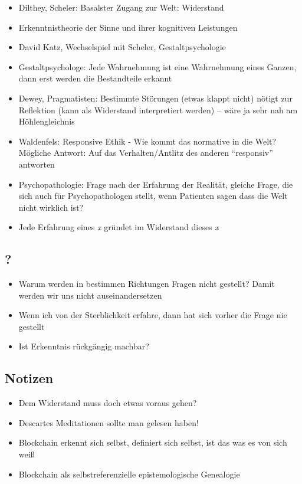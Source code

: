 \documentclass[emulatestandardclasses]{scrartcl}
\begin{document}
\begin{itemize}
  \item Dilthey, Scheler: Basalster Zugang zur Welt: Widerstand
  \item Erkenntnistheorie der Sinne und ihrer kognitiven Leistungen
  \item David Katz, Wechselspiel mit Scheler, Gestaltpsychologie
  \item Gestaltpsychologe: Jede Wahrnehmung ist eine Wahrnehmung eines Ganzen, dann erst werden die Bestandteile erkannt
  \item Dewey, Pragmatisten: Bestimmte Störungen (etwas klappt nicht) nötigt zur Reflektion (kann als Widerstand interpretiert werden) -- wäre ja sehr nah am Höhlengleichnis
  \item Waldenfels: Responsive Ethik - Wie kommt das normative in die Welt? Mögliche Antwort: Auf das Verhalten/Antlitz des anderen "`responsiv"' antworten
  \item Psychopathologie: Frage nach der Erfahrung der Realität, gleiche Frage, die sich auch für Psychopathologen stellt, wenn Patienten sagen dass die Welt nicht wirklich ist?
  \item Jede Erfahrung eines \emph{x} gründet im Widerstand dieses \emph{x}
\end{itemize}

\subsection{?}

\begin{itemize}
  \item Warum werden in bestimmen Richtungen Fragen nicht gestellt? Damit werden wir uns nicht auseinandersetzen
  \item Wenn ich von der Sterblichkeit erfahre, dann hat sich vorher die Frage nie gestellt
  \item Ist Erkenntnis rückgängig machbar?
\end{itemize}


\subsection{Notizen}

\begin{itemize}
  \item Dem Widerstand muss doch etwas voraus gehen?
  \item Descartes Meditationen sollte man gelesen haben!
  \item Blockchain erkennt sich selbst, definiert sich selbst, ist das was es von sich weiß
  \item Blockchain als selbstreferenzielle epistemologische Genealogie
\end{itemize}
\end{document}
